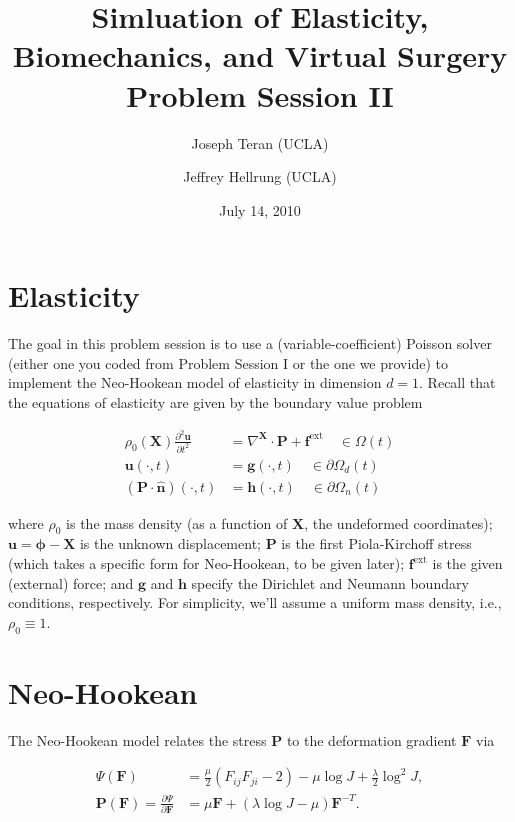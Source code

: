 \documentclass{article}
\title{Simluation of Elasticity, Biomechanics, and Virtual Surgery \\
       Problem Session II}
\date{July 14, 2010}
\author{Joseph Teran (UCLA) \and
        Jeffrey Hellrung (UCLA)}
\begin{document}
\maketitle

\section{Elasticity}

The goal in this problem session is to use a (variable-coefficient) Poisson solver (either one you coded from Problem Session I or the one we provide) to implement the Neo-Hookean model of elasticity in dimension \(d = 1\).  Recall that the equations of elasticity are given by the boundary value problem

\begin{subequations}\label{elasticity}
\begin{align}
\rho_0(\mathbf{X}) \frac{\partial^2 \mathbf{u}}{\partial t^2} & = \nabla^{\mathbf{X}} \cdot \mathbf{P} + \mathbf{f}^{\text{ext}} \quad \in \Omega(t) \\
\mathbf{u}(\cdot,t) & = \mathbf{g}(\cdot,t) \quad \in \partial \Omega_d(t) \\
\left( \mathbf{P} \cdot \mathbf{\hat{n}} \right) (\cdot,t) & = \mathbf{h}(\cdot,t) \quad \in \partial \Omega_n(t)
\end{align}
\end{subequations}

where \(\rho_0\) is the mass density (as a function of \(\mathbf{X}\), the undeformed coordinates); \(\mathbf{u} = \mathbf{\phi} - \mathbf{X}\) is the unknown displacement; \(\mathbf{P}\) is the first Piola-Kirchoff stress (which takes a specific form for Neo-Hookean, to be given later); \(\mathbf{f}^{\text{ext}}\) is the given (external) force; and \(\mathbf{g}\) and \(\mathbf{h}\) specify the Dirichlet and Neumann boundary conditions, respectively.  For simplicity, we'll assume a uniform mass density, i.e., \(\rho_0 \equiv 1\).

\section{Neo-Hookean}

The Neo-Hookean model relates the stress \(\mathbf{P}\) to the deformation gradient \(\mathbf{F}\) via

\begin{subequations}
\begin{align}
\Psi(\mathbf{F}) & = \frac{\mu}{2} \left( F_{ij} F_{ji} - 2 \right) - \mu \log J + \frac{\lambda}{2} \log^2 J, \label{neohookeanstrainenergydensity} \\
\mathbf{P}(\mathbf{F}) = \frac{\partial \Psi}{\partial \mathbf{F}} & = \mu \mathbf{F} + \left( \lambda \log J - \mu \right) \mathbf{F}^{-T}.
\end{align}
\end{subequations}
\end{document}
